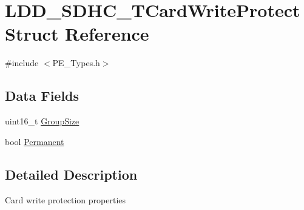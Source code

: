 \hypertarget{struct_l_d_d___s_d_h_c___t_card_write_protect}{\section{L\-D\-D\-\_\-\-S\-D\-H\-C\-\_\-\-T\-Card\-Write\-Protect Struct Reference}
\label{struct_l_d_d___s_d_h_c___t_card_write_protect}
}


{\ttfamily \#include $<$P\-E\-\_\-\-Types.\-h$>$}

\subsection*{Data Fields}
\begin{DoxyCompactItemize}
\item 
uint16\-\_\-t \hyperlink{struct_l_d_d___s_d_h_c___t_card_write_protect_ae05b5dd538cf47f5ec24559246415306}{Group\-Size}
\item 
bool \hyperlink{struct_l_d_d___s_d_h_c___t_card_write_protect_aff6b0178087c770234bd68974d643552}{Permanent}
\end{DoxyCompactItemize}


\subsection{Detailed Description}
Card write protection properties 

